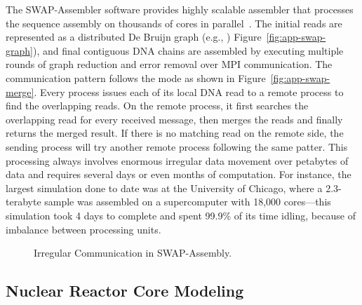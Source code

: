 The SWAP-Assembler software provides highly scalable assembler that processes
the sequence assembly on thousands of cores in parallel~\cite{swap}. The
initial reads are represented as a distributed De Bruijn graph (e.g., )
Figure~\ref{fig:app-swap-graph}), and final contiguous DNA chains are
assembled by executing multiple rounds of graph reduction and error removal
over MPI communication. The communication pattern follows the
 mode as shown in Figure~\ref{fig:app-swap-merge}.
Every process issues each of its local DNA read to a remote process to find
the overlapping reads. On the remote process, it first searches the
overlapping read for every received message, then merges the reads and
finally returns the merged result. If there is no matching read on the
remote side, the sending process will try another remote process following
the same patter. This processing always involves enormous irregular data
movement over petabytes of data and requires several days or even months of
computation. For instance, the largest simulation done to date was at the
University of Chicago, where a 2.3-terabyte sample was assembled on a
supercomputer with 18,000 cores—this simulation took 4 days to complete and
spent 99.9\% of its time idling, because of imbalance between processing
units.



\begin{figure}
\centering
{}
\caption{Irregular Communication in SWAP-Assembly.}
\label{fig:app-swap}
\end{figure}

\subsection{Nuclear Reactor Core Modeling}
